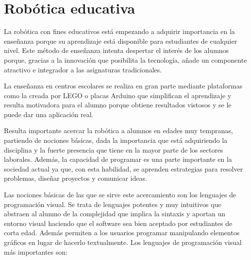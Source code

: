 \section{Robótica educativa}
\label{sec:educativa}
La robótica con fines educativos está empezando a adquirir importancia en la enseñanza porque su aprendizaje está disponible para estudiantes de cualquier nivel. Este método de enseñanza intenta despertar el interés de los alumnos porque, gracias a la innovación que posibilita la tecnología, añade un componente atractivo e integrador a las asignaturas tradicionales. \newline

La enseñanza en centros escolares se realiza en gran parte mediante plataformas como la creada por LEGO o placas Arduino que simplifican el aprendizaje y resulta motivadora para el alumno porque obtiene resultados vistosos y se le puede dar una aplicación real. \newline

Resulta importante acercar la robótica a alumnos en edades muy tempranas, partiendo de nociones básicas, dada la importancia que está adquiriendo la disciplina y la fuerte presencia que tiene en la mayor parte de los sectores laborales. Además, la capacidad de programar es una parte importante en la sociedad actual ya que, con esta habilidad, se aprenden estrategias para resolver problemas, diseñar proyectos y comunicar ideas. \newline


Las nociones básicas de las que se sirve este acercamiento son los lenguajes de programación visual. Se trata de lenguajes potentes y muy intuitivos que abstraen al alumno de la complejidad que implica la sintaxis y aportan un entorno visual haciendo que el software sea bien aceptado por estudiantes de corta edad. Además permiten a los usuarios programar manipulando elementos gráficos en lugar de hacerlo textualmente. Los lenguajes de programación visual más importantes son: 

